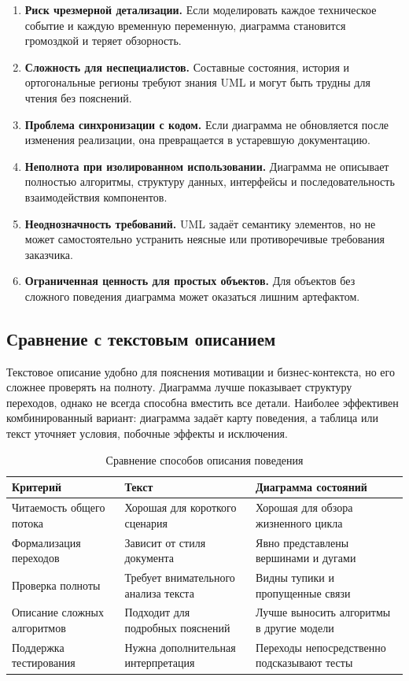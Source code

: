 \documentclass[essay,paper]{pmk-graduate}
\begin{document}
\begin{enumerate}
  \item \textbf{Риск чрезмерной детализации.} Если моделировать каждое техническое событие и каждую временную переменную, диаграмма становится громоздкой и теряет обзорность.
  \item \textbf{Сложность для неспециалистов.} Составные состояния, история и ортогональные регионы требуют знания UML и могут быть трудны для чтения без пояснений.
  \item \textbf{Проблема синхронизации с кодом.} Если диаграмма не обновляется после изменения реализации, она превращается в устаревшую документацию.
  \item \textbf{Неполнота при изолированном использовании.} Диаграмма не описывает полностью алгоритмы, структуру данных, интерфейсы и последовательность взаимодействия компонентов.
  \item \textbf{Неоднозначность требований.} UML задаёт семантику элементов, но не может самостоятельно устранить неясные или противоречивые требования заказчика.
  \item \textbf{Ограниченная ценность для простых объектов.} Для объектов без сложного поведения диаграмма может оказаться лишним артефактом.
\end{enumerate}

\subsection{Сравнение с текстовым описанием}

Текстовое описание удобно для пояснения мотивации и бизнес-контекста, но его сложнее проверять на полноту. Диаграмма лучше показывает структуру переходов, однако не всегда способна вместить все детали. Наиболее эффективен комбинированный вариант: диаграмма задаёт карту поведения, а таблица или текст уточняет условия, побочные эффекты и исключения.

\begin{table}[ht]
\centering
\caption{Сравнение способов описания поведения}
\begin{tabularx}{\textwidth}{|p{3cm}|X|X|}
\hline
\textbf{Критерий} & \textbf{Текст} & \textbf{Диаграмма состояний} \\ \hline
Читаемость общего потока & Хорошая для короткого сценария & Хорошая для обзора жизненного цикла \\ \hline
Формализация переходов & Зависит от стиля документа & Явно представлены вершинами и дугами \\ \hline
Проверка полноты & Требует внимательного анализа текста & Видны тупики и пропущенные связи \\ \hline
Описание сложных алгоритмов & Подходит для подробных пояснений & Лучше выносить алгоритмы в другие модели \\ \hline
Поддержка тестирования & Нужна дополнительная интерпретация & Переходы непосредственно подсказывают тесты \\ \hline
\end{tabularx}
\end{table}
\end{document}
